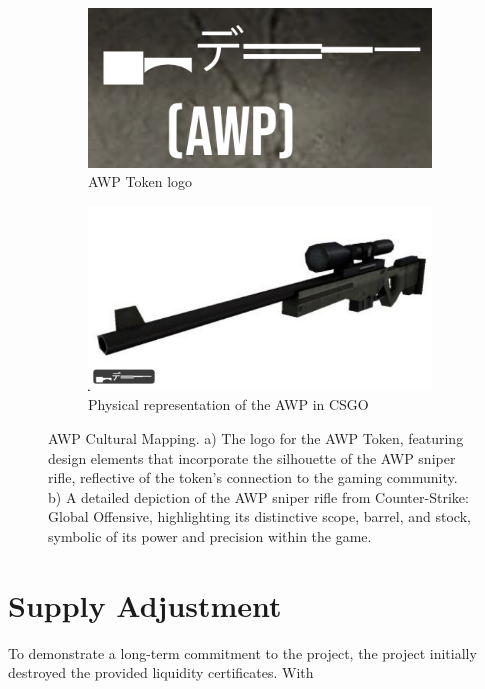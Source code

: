 \documentclass[journal,onecolumn,]{IEEEtran}
\begin{document}
		\begin{figure}[h]
		\centering
		\begin{subfigure}{0.45\linewidth}
			\includegraphics[width=1\linewidth]{figure/1.png}
			\caption{AWP Token logo}
			\label{pic:12}
		\end{subfigure}
		\begin{subfigure}{0.45\linewidth}
			\includegraphics[width=1\linewidth]{figure/3.png}
			\caption{Physical representation of the AWP in CSGO}
			\label{pic:11}
		\end{subfigure}
		\caption{
			AWP Cultural Mapping. a) The logo for the AWP Token, featuring design elements that incorporate the silhouette of the AWP sniper rifle, reflective of the token's connection to the gaming community. b) A detailed depiction of the AWP sniper rifle from Counter-Strike: Global Offensive, highlighting its distinctive scope, barrel, and stock, symbolic of its power and precision within the game. }
		\label{pic:1}
		\vspace{-0.5cm}
	\end{figure}
	
	
	\section{Supply Adjustment}
	To demonstrate a long-term commitment to the project, the project initially destroyed the provided liquidity certificates. With 
	
\end{document}
